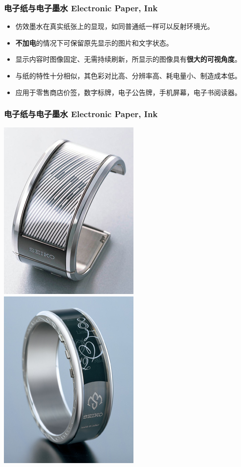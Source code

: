 \documentclass{beamer}
\begin{document}
\begin{frame}[transwipe]
	\frametitle{电子纸与电子墨水 Electronic Paper, Ink}
	\beamertemplatetransparentcovereddynamicmedium
	\begin{itemize}[<+->]
		\item 仿效墨水在真实纸张上的显现，如同普通纸一样可以反射环境光。
		\item \textbf{不加电}的情况下可保留原先显示的图片和文字状态。
		\item 显示内容时图像固定、无需持续刷新，所显示的图像具有\textbf{很大的可视角度}。
		\item 与纸的特性十分相似，其色彩对比高、分辨率高、耗电量小、制造成本低。
		\item 应用于零售商店价签，数字标牌，电子公告牌，手机屏幕，电子书阅读器。
	\end{itemize}
\end{frame}

\begin{frame}
	\frametitle{电子纸与电子墨水 Electronic Paper, Ink}
	\transwipe
	\begin{center}
	\includegraphics[height=.8\textheight, width=.4\textwidth]{images/e-ink-watch1.jpg}
	\includegraphics[height=.8\textheight, width=.4\textwidth]{images/e-ink-watch2.jpg}
	\end{center}
\end{frame}
\end{document}
